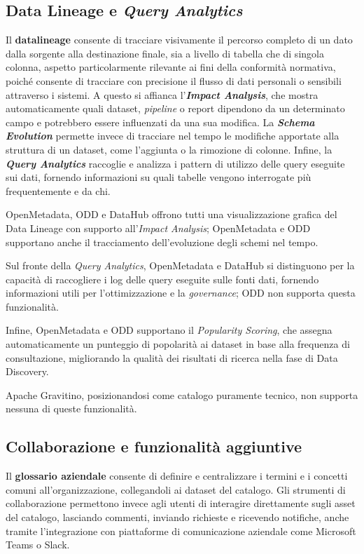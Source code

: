 \subsection{Data Lineage e \emph{Query Analytics}}
Il \textbf{\gls{datalineage}} consente di tracciare visivamente il percorso completo di un dato dalla sorgente alla destinazione finale, sia a livello di tabella che di singola 
colonna, aspetto particolarmente rilevante ai fini della conformità normativa, poiché consente di tracciare con precisione il flusso di dati personali o sensibili attraverso i sistemi. 
A questo si affianca l'\textbf{\emph{Impact Analysis}}, che mostra automaticamente quali dataset, \emph{pipeline} o report dipendono da un determinato campo e potrebbero essere influenzati da una sua modifica. 
La \textbf{\emph{Schema Evolution}} permette invece di tracciare nel tempo le modifiche apportate alla struttura di un dataset, come l'aggiunta o la rimozione di colonne. 
Infine, la \textbf{\emph{Query Analytics}} raccoglie e analizza i pattern di utilizzo delle query eseguite sui dati, fornendo informazioni su quali tabelle vengono interrogate più frequentemente e da chi.

OpenMetadata, ODD e DataHub offrono tutti una visualizzazione grafica del Data Lineage con supporto all'\emph{Impact Analysis}; OpenMetadata e ODD supportano anche il tracciamento dell'evoluzione degli schemi nel tempo.

Sul fronte della \emph{Query Analytics}, OpenMetadata e DataHub si distinguono per la capacità di raccogliere i log delle query eseguite sulle fonti dati, fornendo informazioni utili per l'ottimizzazione e la \emph{governance}; ODD non supporta questa funzionalità.

Infine, OpenMetadata e ODD supportano il \emph{Popularity Scoring}, che assegna automaticamente un punteggio di popolarità ai dataset in base alla frequenza di consultazione, migliorando la qualità dei risultati di ricerca nella fase di Data Discovery. 

Apache Gravitino, posizionandosi come catalogo puramente tecnico, non supporta nessuna di queste funzionalità.


\subsection{Collaborazione e funzionalità aggiuntive}
Il \textbf{glossario aziendale} consente di definire e centralizzare i termini e i concetti comuni all'organizzazione, collegandoli ai dataset del catalogo. 
Gli strumenti di collaborazione permettono invece agli utenti di interagire direttamente sugli asset del catalogo, lasciando commenti, inviando richieste e ricevendo notifiche, 
anche tramite l'integrazione con piattaforme di comunicazione aziendale come Microsoft Teams o Slack.

